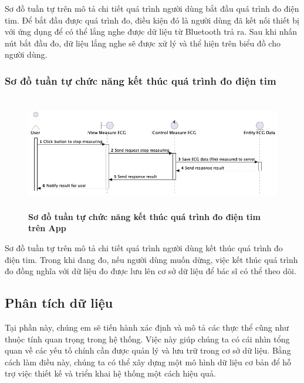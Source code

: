   Sơ đồ tuần tự trên mô tả chi tiết quá trình người dùng bắt đầu quá trình đo điện tim. Để bắt đầu được quá trình đo, điều
  kiện đó là người dùng đã kết nối thiết bị với ứng dụng để có thể lắng nghe được dữ liệu từ Bluetooth trả ra. Sau khi nhấn nút bắt đầu đo,
  dữ liệu lắng nghe sẽ được xử lý và thể hiện trên biểu đồ cho người dùng.

\subsubsection{Sơ đồ tuần tự chức năng kết thúc quá trình đo điện tim}

  \begin{figure}[H]
        \centering
        \includegraphics[width=12cm,height=5cm]{Images/mobile_app/end_measuring_ecg.png}
        \caption[Sơ đồ tuần tự chức năng kết thúc quá trình đo điện tim trên App]{\bfseries \fontsize{12pt}{0pt}
        \selectfont Sơ đồ tuần tự chức năng kết thúc quá trình đo điện tim trên App}
        \label{end_measuring_ecg} %
  \end{figure}

  Sơ đồ tuần tự trên mô tả chi tiết quá trình người dùng kết thúc quá trình đo điện tim. Trong khi đang đo, nếu người dùng muốn dừng, 
  việc kết thúc quá trình đo đồng nghĩa với dữ liệu đo được lưu lên cơ sở dữ liệu để bác sĩ có thể theo dõi.

\subsection{Phân tích dữ liệu}

Tại phần này, chúng em sẽ tiến hành xác định và mô tả các thực thể cũng như
 thuộc tính quan trọng trong hệ thống. Việc này giúp chúng ta có cái
  nhìn tổng quan về các yếu tố chính cần được quản lý và lưu trữ
   trong cơ sở dữ liệu. Bằng cách làm điều này, chúng ta có thể
    xây dựng một mô hình dữ liệu cơ bản để hỗ trợ việc thiết kế và
     triển khai hệ thống một cách hiệu quả.


